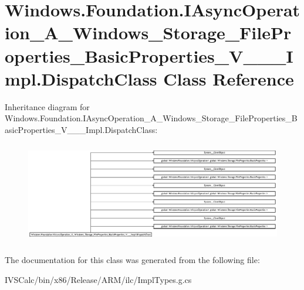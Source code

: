 \hypertarget{class_windows_1_1_foundation_1_1_i_async_operation___a___windows___storage___file_properties___b88ef85ab316c70508d8fae916a51c4b7}{}\section{Windows.\+Foundation.\+I\+Async\+Operation\+\_\+\+A\+\_\+\+Windows\+\_\+\+Storage\+\_\+\+File\+Properties\+\_\+\+Basic\+Properties\+\_\+\+V\+\_\+\+\_\+\+\_\+\+Impl.\+Dispatch\+Class Class Reference}
\label{class_windows_1_1_foundation_1_1_i_async_operation___a___windows___storage___file_properties___b88ef85ab316c70508d8fae916a51c4b7}
Inheritance diagram for Windows.\+Foundation.\+I\+Async\+Operation\+\_\+\+A\+\_\+\+Windows\+\_\+\+Storage\+\_\+\+File\+Properties\+\_\+\+Basic\+Properties\+\_\+\+V\+\_\+\+\_\+\+\_\+\+Impl.\+Dispatch\+Class\+:\begin{figure}[H]
\begin{center}
\leavevmode
\includegraphics[height=4.496350cm]{class_windows_1_1_foundation_1_1_i_async_operation___a___windows___storage___file_properties___b88ef85ab316c70508d8fae916a51c4b7}
\end{center}
\end{figure}


The documentation for this class was generated from the following file\+:\begin{DoxyCompactItemize}
\item 
I\+V\+S\+Calc/bin/x86/\+Release/\+A\+R\+M/ilc/Impl\+Types.\+g.\+cs\end{DoxyCompactItemize}
